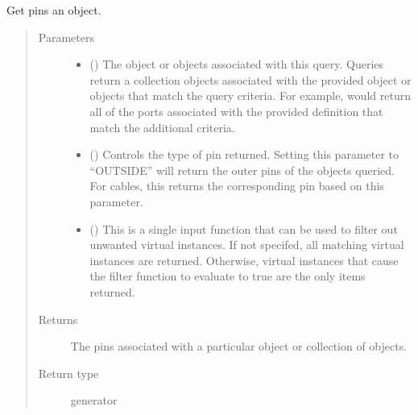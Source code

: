 \documentclass[letterpaper,10pt,english,openany,oneside]{sphinxmanual}
\begin{document}
\begin{fulllineitems}
\label{\detokenize{reference/classes/generated/spydrnet.get_pins:spydrnet.get_pins}}
Get pins  an object.
\begin{quote}\begin{description}
\item[{Parameters}] \leavevmode\begin{itemize}
\item {} 
 () \textendash{} The object or objects associated with this query. Queries return a collection objects associated with the
provided object or objects that match the query criteria. For example,  would
return all of the ports associated with the provided definition that match the additional criteria.

\item {} 
 () \textendash{} Controls the type of pin returned. Setting this parameter to “OUTSIDE” will return the outer pins of the objects
queried. For cables, this returns the corresponding pin based on this parameter.

\item {} 
 () \textendash{} This is a single input function that can be used to filter out unwanted virtual instances. If not specifed, all
matching virtual instances are returned. Otherwise, virtual instances that cause the filter function to evaluate
to true are the only items returned.

\end{itemize}

\item[{Returns}] \leavevmode
{} \textendash{} The pins associated with a particular object or collection of objects.

\item[{Return type}] \leavevmode
generator

\end{description}\end{quote}

\end{fulllineitems}
\end{document}
